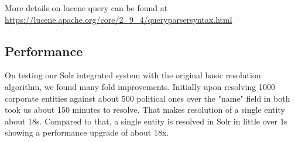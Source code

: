     More details on lucene query can be found at \url{https://lucene.apache.org/core/2\_9\_4/queryparsersyntax.html}
\subsection{Performance}
    On testing our Solr integrated system with the original basic resolution algorithm, we found many fold improvements. Initially upon resolving 1000 corporate entities against about 500 political ones over the "name" field in both took us about 150 minutes to resolve. That makes resolution of a single entity about 18s.
    Compared to that, a single entity is resolved in Solr in little over 1s showing a performance upgrade of about 18x.

